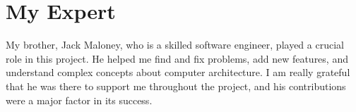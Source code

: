 \documentclass[12pt, letterpaper]{article}
\begin{document}
\section{My Expert}

My brother, Jack Maloney, who is a skilled software engineer, played a crucial role in this project. He helped me find 
and fix problems, add new features, and understand complex concepts about computer architecture. I am really grateful 
that he was there to support me throughout the project, and his contributions were a major factor in its success.

\printbibliography
\end{document}
